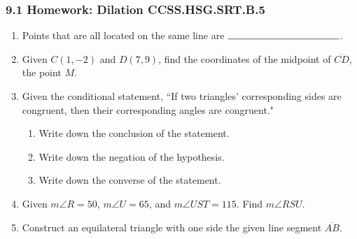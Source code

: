 \documentclass[12pt, twoside]{article}
\begin{document}
\subsubsection*{9.1 Homework: Dilation \hfill CCSS.HSG.SRT.B.5}
\begin{enumerate}
\item Points that are all located on the same line are $\rule{4cm}{0.15mm}$. \bigskip

\item Given $C(1,-2)$ and $D(7,9)$, find the coordinates of the midpoint of $\overline{CD}$, the point $M$.
  \vspace{4cm}

\item Given the conditional statement, ``If two triangles' corresponding sides are congruent, then their corresponding angles are congruent."
  \begin{enumerate}
    \item Write down the conclusion of the statement. \vspace{1.5cm}
    \item Write down the negation of the hypothesis. \vspace{1.5cm}
    \item Write down the converse of the statement. \vspace{2.5cm}
  \end{enumerate}

\item Given $m\angle R=50$, $m\angle U =65$, and $m\angle UST=115$. Find $m\angle RSU$.\\[1cm]
  \vspace{3cm}

\newpage
\item Construct an equilateral triangle with one side the given line segment $\overline{AB}$.\\
  \vspace{5cm}
  \begin{center}
  \end{center}
  \vspace{2cm}


\end{enumerate}
\end{document}
